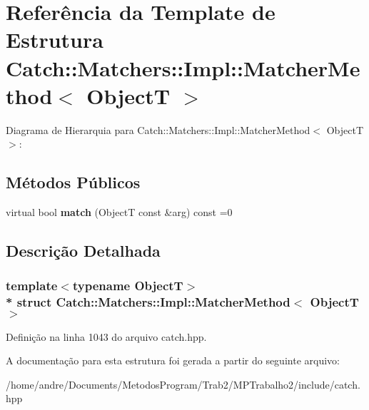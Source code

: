 \hypertarget{structCatch_1_1Matchers_1_1Impl_1_1MatcherMethod}{}\section{Referência da Template de Estrutura Catch\+:\+:Matchers\+:\+:Impl\+:\+:Matcher\+Method$<$ ObjectT $>$}
\label{structCatch_1_1Matchers_1_1Impl_1_1MatcherMethod}


Diagrama de Hierarquia para Catch\+:\+:Matchers\+:\+:Impl\+:\+:Matcher\+Method$<$ ObjectT $>$\+:
\subsection*{Métodos Públicos}
\begin{DoxyCompactItemize}
\item 
virtual bool {\bfseries match} (ObjectT const \&arg) const =0\hypertarget{structCatch_1_1Matchers_1_1Impl_1_1MatcherMethod_ae0920ff9e817acf08e1bb0cbcb044e30}{}\label{structCatch_1_1Matchers_1_1Impl_1_1MatcherMethod_ae0920ff9e817acf08e1bb0cbcb044e30}

\end{DoxyCompactItemize}


\subsection{Descrição Detalhada}
\subsubsection*{template$<$typename ObjectT$>$\\*
struct Catch\+::\+Matchers\+::\+Impl\+::\+Matcher\+Method$<$ Object\+T $>$}



Definição na linha 1043 do arquivo catch.\+hpp.



A documentação para esta estrutura foi gerada a partir do seguinte arquivo\+:\begin{DoxyCompactItemize}
\item 
/home/andre/\+Documents/\+Metodos\+Program/\+Trab2/\+M\+P\+Trabalho2/include/catch.\+hpp\end{DoxyCompactItemize}
